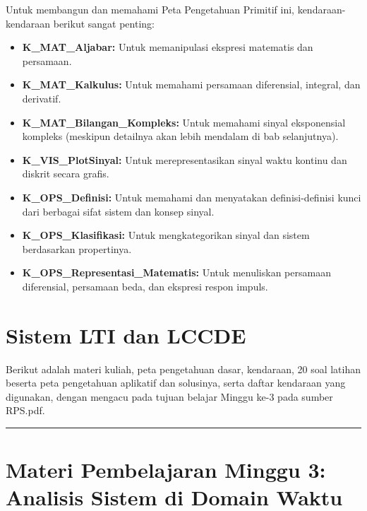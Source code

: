 \documentclass[
  letterpaper,
  DIV=11,
  numbers=noendperiod]{scrreprt}
\providecommand{\tightlist}{%
  \setlength{\itemsep}{0pt}\setlength{\parskip}{0pt}}
\begin{document}
Untuk membangun dan memahami Peta Pengetahuan Primitif ini,
kendaraan-kendaraan berikut sangat penting:

\begin{itemize}
\tightlist
\item
  \textbf{K\_MAT\_Aljabar:} Untuk memanipulasi ekspresi matematis dan
  persamaan.
\item
  \textbf{K\_MAT\_Kalkulus:} Untuk memahami persamaan diferensial,
  integral, dan derivatif.
\item
  \textbf{K\_MAT\_Bilangan\_Kompleks:} Untuk memahami sinyal
  eksponensial kompleks (meskipun detailnya akan lebih mendalam di bab
  selanjutnya).
\item
  \textbf{K\_VIS\_PlotSinyal:} Untuk merepresentasikan sinyal waktu
  kontinu dan diskrit secara grafis.
\item
  \textbf{K\_OPS\_Definisi:} Untuk memahami dan menyatakan
  definisi-definisi kunci dari berbagai sifat sistem dan konsep sinyal.
\item
  \textbf{K\_OPS\_Klasifikasi:} Untuk mengkategorikan sinyal dan sistem
  berdasarkan propertinya.
\item
  \textbf{K\_OPS\_Representasi\_Matematis:} Untuk menuliskan persamaan
  diferensial, persamaan beda, dan ekspresi respon impuls.
\end{itemize}


\chapter{Sistem LTI dan LCCDE}\label{sistem-lti-dan-lccde}

Berikut adalah materi kuliah, peta pengetahuan dasar, kendaraan, 20 soal
latihan beserta peta pengetahuan aplikatif dan solusinya, serta daftar
kendaraan yang digunakan, dengan mengacu pada tujuan belajar Minggu ke-3
pada sumber RPS.pdf.

\begin{center}\rule{0.5\linewidth}{0.5pt}\end{center}


\chapter{Materi Pembelajaran Minggu 3: Analisis Sistem di Domain
Waktu}\label{materi-pembelajaran-minggu-3-analisis-sistem-di-domain-waktu}
\end{document}
